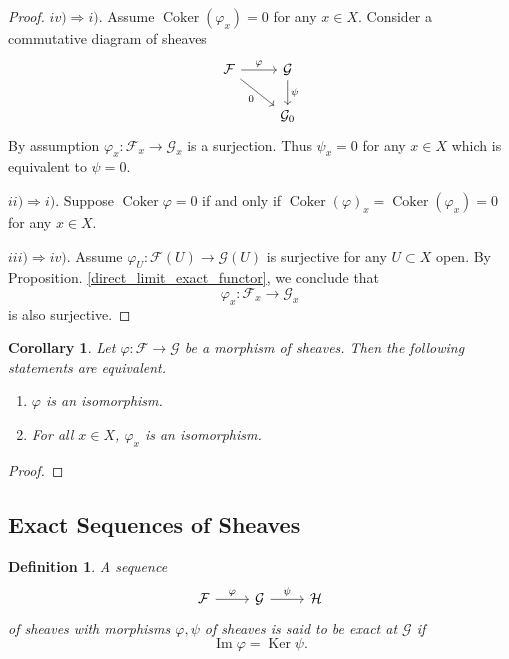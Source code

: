 \documentclass{article}
\newtheorem{definition}{Definition}[section]
\newtheorem{corollary}{Corollary}[section]
\numberwithin{equation}{section}
\DeclareMathOperator{\Ker}{Ker}
\DeclareMathOperator{\Image}{Im}
\DeclareMathOperator{\Coker}{Coker}
\begin{document}
\begin{proof}
\par $iv)\Rightarrow i)$. Assume $\Coker(\varphi_x)=0$ for any $x\in X$. Consider a commutative diagram of sheaves
\[
\begin{tikzcd}
\mathcal{F} \arrow[r, "\varphi"] \arrow[rd, "0"'] & \mathcal{G} \arrow[d, "\psi"] \\
                                                  & \mathcal{G}_0                
\end{tikzcd}
\]
By assumption $\varphi_x:\mathcal{F}_x\to\mathcal{G}_x$ is a surjection. Thus $\psi_x=0$ for any $x\in X$ which is equivalent to $\psi=0$.\\
\par $ii)\Rightarrow i)$. Suppose $\Coker\varphi=0$ if and only if $\Coker(\varphi)_x=\Coker(\varphi_x)=0$ for any $x\in X$. \\
\par $iii)\Rightarrow iv)$. Assume $\varphi_U:\mathcal{F}(U)\to\mathcal{G}(U)$ is surjective for any $U\subset X$ open. By Proposition. \ref{direct_limit_exact_functor}, we conclude that 
\begin{equation*}
\varphi_x:\mathcal{F}_x\to\mathcal{G}_x
\end{equation*}
is also surjective.
\end{proof}

\begin{corollary}
Let $\varphi:\mathcal{F}\to\mathcal{G}$ be a morphism of sheaves. Then the following statements are equivalent.
\begin{enumerate}[1).]
\item $\varphi$ is an isomorphism.
\item For all $x\in X$, $\varphi_x$ is an isomorphism. 
\end{enumerate}
\end{corollary}

\begin{proof}
\end{proof}

\subsection{Exact Sequences of Sheaves}

\begin{definition}
A sequence
\[
\begin{tikzcd}
\mathcal{F}\arrow[r,"\varphi"]&\mathcal{G}\arrow[r,"\psi"]&\mathcal{H}
\end{tikzcd}
\]
of sheaves with morphisms $\varphi,\psi$ of sheaves is said to be exact at $\mathcal{G}$ if
\begin{equation*}
\Image\varphi=\Ker\psi.
\end{equation*}
\end{definition}
\end{document}
